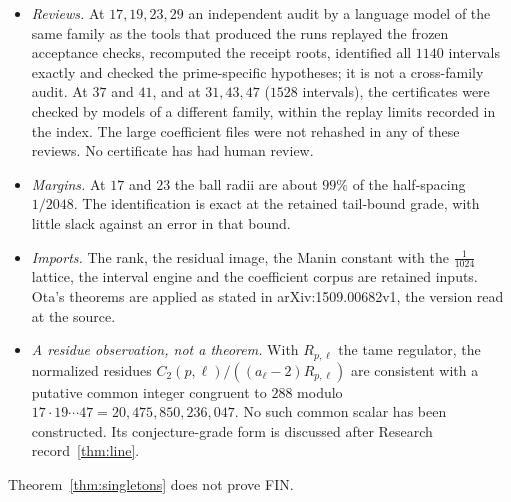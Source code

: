 \begin{remark}\label{rem:singletons}
\begin{itemize}[leftmargin=*]
\item \emph{Reviews.} At $17,19,23,29$ an independent audit by a language model of the same family as the tools that produced the runs replayed the frozen acceptance checks, recomputed the receipt roots, identified all $1140$ intervals exactly and checked the prime-specific hypotheses; it is not a cross-family audit. At $37$ and $41$, and at $31,43,47$ ($1528$ intervals), the certificates were checked by models of a different family, within the replay limits recorded in the index. The large coefficient files were not rehashed in any of these reviews. No certificate has had human review.
\item \emph{Margins.} At $17$ and $23$ the ball radii are about $99\%$ of the half-spacing $1/2048$. The identification is exact at the retained tail-bound grade, with little slack against an error in that bound.
\item \emph{Imports.} The rank, the residual image, the Manin constant with the $\frac1{1024}$ lattice, the interval engine and the coefficient corpus are retained inputs. Ota's theorems are applied as stated in arXiv:1509.00682v1, the version read at the source.
\item \emph{A residue observation, not a theorem.} With $R_{p,\ell}$ the tame regulator, the normalized residues $C_2(p,\ell)/((a_\ell-2)R_{p,\ell})$ are consistent with a putative common integer congruent to $288$ modulo $17\cdot19\cdots47=20{,}475{,}850{,}236{,}047$. No such common scalar has been constructed. Its conjecture-grade form is discussed after Research record~\ref{thm:line}.
\end{itemize}
Theorem~\ref{thm:singletons} does not prove FIN.
\end{remark}
